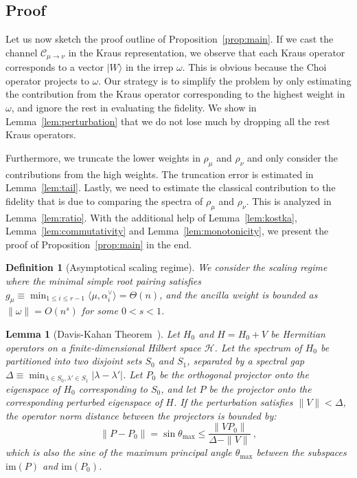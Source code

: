 \documentclass[11pt,letterpaper]{article}
\newtheorem{lem}{Lemma}
\newtheorem{defn}{Definition}
\newcommand{\ket}[1]{| #1 \rangle}
\def\h{\mathcal{H}}
\def\C{\mathcal{C}}
\begin{document}
\subsection{Proof}

Let us now sketch the proof outline of Proposition~\ref{prop:main}. If we cast the channel $\C_{\mu\to\nu}$ in the Kraus representation, we observe that each Kraus operator corresponds to a vector $\ket{W}$ in the irrep $\omega$. This is obvious because the Choi operator projects to $\omega$. Our strategy is to simplify the problem by only estimating the contribution from the Kraus operator corresponding to the highest weight in $\omega$, and ignore the rest in evaluating the fidelity. We show in Lemma~\ref{lem:perturbation} that we do not lose much by dropping all the rest Kraus operators.

Furthermore, we truncate the lower weights in $\rho_\mu$ and $\rho_\nu$ and only consider the contributions from the high weights. The truncation error is estimated in Lemma~\ref{lem:tail}. Lastly, we need to estimate the classical contribution to the fidelity that is due to comparing the spectra of $\rho_\mu$ and $\rho_\nu$. This is analyzed in Lemma~\ref{lem:ratio}. With the additional help of Lemma~\ref{lem:kostka}, Lemma~\ref{lem:commutativity} and Lemma~\ref{lem:monotonicity}, we present the proof of Proposition~\ref{prop:main} in the end.

\begin{defn}[Asymptotical scaling regime]\label{def:scaling}
    We consider the scaling regime where the minimal simple root pairing satisfies $g_\mu \equiv \min_{1\le i \le r-1} \langle \mu, \alpha_i^\vee \rangle = \Theta(n)$, and the ancilla weight is bounded as $\|\omega\| = O(n^s)$ for some $0 < s < 1$. 
\end{defn}

\begin{lem}[Davis-Kahan Theorem~\cite{davis1970rotation}]\label{lem:davis_kahan}
    Let $H_0$ and $H = H_0 + V$ be Hermitian operators on a finite-dimensional Hilbert space $\h$. Let the spectrum of $H_0$ be partitioned into two disjoint sets $S_0$ and $S_1$, separated by a spectral gap $\Delta \equiv \min_{\lambda \in S_0, \lambda' \in S_1} |\lambda - \lambda'|$.
    Let $P_0$ be the orthogonal projector onto the eigenspace of $H_0$ corresponding to $S_0$, and let $P$ be the projector onto the corresponding perturbed eigenspace of $H$. 
    If the perturbation satisfies $\|V\| < \Delta$, the operator norm distance between the projectors is bounded by:
    \begin{equation}
        \|P - P_0\|=\sin\theta_{\max} \le \frac{\|V P_0\|}{\Delta - \|V\|} \ ,
    \end{equation}
    which is also the sine of the maximum principal angle $\theta_{\max}$ between the subspaces $\mathrm{im}(P)$ and $\mathrm{im}(P_0)$.
\end{lem}
\end{document}
